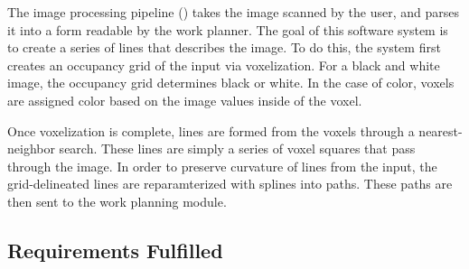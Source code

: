 The image processing pipeline () takes the image scanned by the user, and parses it into a form readable by the work planner. The goal of this software system is to create a series of lines that describes the image. To do this, the system first creates an occupancy grid of the input via voxelization. For a black and white image, the occupancy grid determines black or white. In the case of color, voxels are assigned color based on the image values inside of the voxel.

Once voxelization is complete, lines are formed from the voxels through a nearest-neighbor search. These lines are simply a series of voxel squares that pass through the image. In order to preserve curvature of lines from the input, the grid-delineated lines are reparamterized with splines into paths. These paths are then sent to the work planning module.

\subsection{Requirements Fulfilled}
\label{subsec:image_processing_req_fulfilled}
